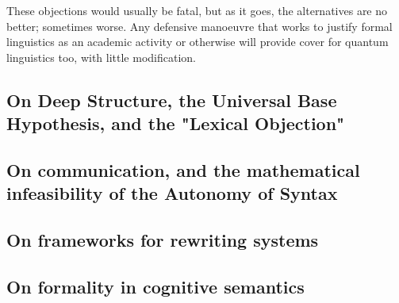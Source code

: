 These objections would usually be fatal, but as it goes, the alternatives are no better; sometimes worse. Any defensive manoeuvre that works to justify formal linguistics as an academic activity or otherwise will provide cover for quantum linguistics too, with little modification.

\subsection{On Deep Structure, the Universal Base Hypothesis, and the "Lexical Objection"}

\subsection{On communication, and the mathematical infeasibility of the Autonomy of Syntax}

\subsection{On frameworks for rewriting systems}

\subsection{On formality in cognitive semantics}


